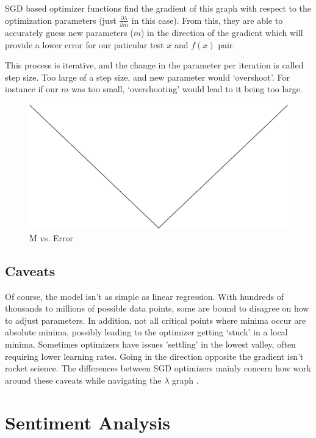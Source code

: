 \documentclass[titlepage,letterpaper]{article}
\begin{document}
SGD based optimizer functions find the gradient of this graph with respect to the optimization parameters (just $\frac{\partial\lambda}{\partial m}$ in this case). From this, they are able to accurately guess new parameters ($m$) in the direction of the gradient which will provide a lower error for our paticular test \(x\) and \(f(x)\) pair. 

This process is iterative, and the change in the parameter per iteration is called step size. Too large of a step size, and new parameter would `overshoot'. For instance if our $m$ was too small, `overshooting' would lead to it being too large.

\begin{figure}[h]
	\centering 
	\label{fig:m_vs_error}
	\caption{M vs. Error}
	\includegraphics[scale=.11]{error_function.eps}
	\vspace{-55pt}
\end{figure}


\subsection{Caveats}
Of course, the model isn't as simple as linear regression. With hundreds of thousands to millions of possible data points, some are bound to disagree on how to adjust parameters. In addition, not all critical points where minima occur are absolute minima, possibly leading to the optimizer  getting `stuck' in a local minima. Sometimes optimizers have issues 'settling' in the lowest valley, often requiring lower learning rates.\cite{adaprop} Going in the direction opposite the gradient isn't rocket science. The differences between SGD optimizers mainly concern how work around these caveats while navigating the $\lambda$ graph \cite{adaprop,adam,rmsprop,moment}.

\section{Sentiment Analysis}
\end{document}
